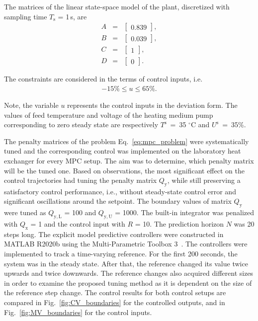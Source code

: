 \documentclass[preprint,12pt]{elsarticle}
\begin{document}
The matrices of the linear state-space model of the plant, discretized with sampling time $T_\mathrm{s}$ = 1\,s, are
\begin{subequations}
	\label{eq:model_A_B} 
	\begin{eqnarray}
		A&=&\begin{bmatrix}
			0.839
		\end{bmatrix}, \\
		B&=&\begin{bmatrix}
			0.039
		\end{bmatrix}, \\
		C&=&\begin{bmatrix}
			1
		\end{bmatrix}, \\
		D&=&\begin{bmatrix}
			0
		\end{bmatrix}.
		\end{eqnarray}
\end{subequations}

The constraints are considered in the terms of control inputs, i.e.
\begin{eqnarray}
\label{eq:u_const}
	-15\% \le u \le 65\%.
\end{eqnarray}

Note, the variable $u$ represents the control inputs in the deviation form. The values of feed temperature and voltage of the heating medium pump corresponding to zero steady state are respectively $T^\mathrm{s}$~=~35 $^{\circ}\mathrm{C}$ and $U^\mathrm{s}$~=~35\%.

The penalty matrices of the problem Eq.~\eqref{eq:mpc_problem} were systematically tuned and the corresponding control was implemented on the laboratory heat exchanger for every MPC setup. The aim was to determine, which penalty matrix will be the tuned one. Based on observations, the most significant effect on the control trajectories had tuning the penalty matrix $Q_\mathrm{y}$, while still preserving a satisfactory control performance, i.e., without steady-state control error and significant oscillations around the setpoint. The boundary values of matrix $Q_\mathrm{y}$ were tuned as $Q_\mathrm{y, L}$ = 100 and $Q_\mathrm{y, U}$ = 1000. The built-in integrator was penalized with $Q_\mathrm{x}$ = 1 and the control input with $R$ = 10. The prediction horizon $N$ was 20 steps long. The explicit model predictive controllers were constructed in MATLAB R2020b using the Multi-Parametric Toolbox 3~\cite{mpt_conf}. 
The controllers were implemented to track a time-varying reference. For the first 200 seconds, the system was in the steady state. After that, the reference changed its value twice upwards and twice downwards. The reference changes also acquired different sizes in order to examine the proposed tuning method as it is dependent on the size of the reference step change. The control results for both control setups are compared in Fig.~\ref{fig:CV_boundaries} for the controlled outputs, and in Fig.~\ref{fig:MV_boundaries} for the control inputs.
    
\end{document}
